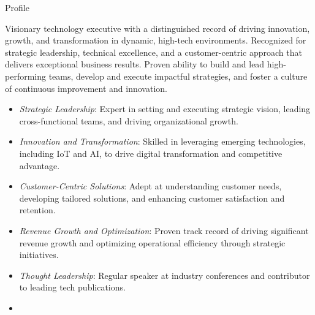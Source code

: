 \documentclass{resume} %
\begin{document}
\vspace{-1em}
\begin{rSection}{Profile}
  
  Visionary technology executive with a distinguished record of driving innovation, growth, and transformation in dynamic, high-tech environments. Recognized for strategic leadership, technical excellence, and a customer-centric approach that delivers exceptional business results. Proven ability to build and lead high-performing teams, develop and execute impactful strategies, and foster a culture of continuous improvement and innovation.

  \begin{itemize}
    \setlength\itemsep{-0.5em}
    \item \textit{Strategic Leadership}: Expert in setting and executing strategic vision, leading cross-functional teams, and driving organizational growth.
    \item \textit{Innovation and Transformation}: Skilled in leveraging emerging technologies, including IoT and AI, to drive digital transformation and competitive advantage.
    \item \textit{Customer-Centric Solutions}: Adept at understanding customer needs, developing tailored solutions, and enhancing customer satisfaction and retention.
    \item \textit{Revenue Growth and Optimization}: Proven track record of driving significant revenue growth and optimizing operational efficiency through strategic initiatives.
    \item \textit{Thought Leadership}: Regular speaker at industry conferences and contributor to leading tech publications.
    \item %
  \end{itemize}
  
\end{rSection}


\end{document}
